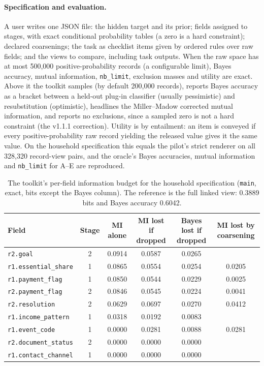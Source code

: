 \documentclass[11pt]{article}
\newcommand{\code}[1]{\texttt{#1}}
\begin{document}
\paragraph{Specification and evaluation.} A user writes one JSON file: the hidden target and its prior; fields assigned to stages, with exact conditional probability tables (a zero is a hard constraint); declared coarsenings; the task as checklist items given by ordered rules over raw fields; and the views to compare, including task outputs. When the raw space has at most 500,000 positive-probability records (a configurable limit), Bayes accuracy, mutual information, \code{nb\_limit}, exclusion masses and utility are exact. Above it the toolkit samples (by default 200,000 records), reports Bayes accuracy as a bracket between a held-out plug-in classifier (usually pessimistic) and resubstitution (optimistic), headlines the Miller--Madow corrected mutual information, and reports no exclusions, since a sampled zero is not a hard constraint (the v1.1.1 correction). Utility is by entailment: an item is conveyed if every positive-probability raw record yielding the released value gives it the same value. On the household specification this equals the pilot's strict renderer on all 328,320 record-view pairs, and the oracle's Bayes accuracies, mutual information and \code{nb\_limit} for A--E are reproduced.

\begin{table}[htbp]
\centering\footnotesize
\caption{The toolkit's per-field information budget for the household specification (\code{main}, exact, bits except the Bayes column). The reference is the full linked view: 0.3889 bits and Bayes accuracy 0.6042.}
\label{tab:budget}
\begin{tabular}{@{}lccccc@{}}
\toprule
Field & Stage & MI alone & MI lost if dropped & Bayes lost if dropped & MI lost by coarsening \\
\midrule
\code{r2.goal} & 2 & 0.0914 & 0.0587 & 0.0265 & \\
\code{r1.essential\_share} & 1 & 0.0865 & 0.0554 & 0.0254 & 0.0205 \\
\code{r1.payment\_flag} & 1 & 0.0850 & 0.0544 & 0.0229 & 0.0025 \\
\code{r2.payment\_flag} & 2 & 0.0846 & 0.0545 & 0.0224 & 0.0041 \\
\code{r2.resolution} & 2 & 0.0629 & 0.0697 & 0.0270 & 0.0412 \\
\code{r1.income\_pattern} & 1 & 0.0318 & 0.0192 & 0.0083 & \\
\code{r1.event\_code} & 1 & 0.0000 & 0.0281 & 0.0088 & 0.0281 \\
\code{r2.document\_status} & 2 & 0.0000 & 0.0000 & 0.0000 & \\
\code{r1.contact\_channel} & 1 & 0.0000 & 0.0000 & 0.0000 & \\
\bottomrule
\end{tabular}
\end{table}
\end{document}
